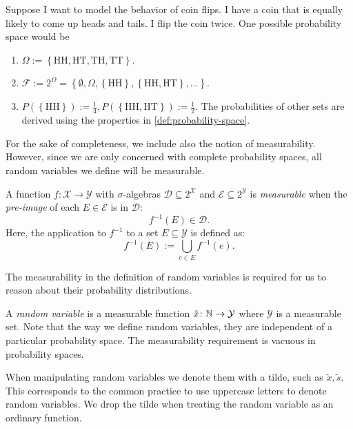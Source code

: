 \begin{example} \label{exm:probability-space}
 Suppose I want to model the behavior of coin flips. I have a coin that is equally likely to come up heads and tails. I flip the coin twice. One possible probability space would be
  \begin{enumerate}
  \item $\Omega := \left\{ \mathrm{HH}, \mathrm{HT}, \mathrm{TH}, \mathrm{TT} \right\}$.
  \item $\mathcal{F} := 2^{\Omega } = \left\{ \emptyset, \Omega, \left\{ \mathrm{HH} \right\}, \left\{ \mathrm{HH}, \mathrm{HT} \right\}, \dots  \right\}$.
  \item $P(\left\{ \mathrm{HH} \right\}) := \frac{1}{4},  P(\left\{ \mathrm{HH}, \mathrm{HT} \right\}) := \frac{1}{2}$. The probabilities of other sets are derived using the properties in \cref{def:probability-space}.
  \end{enumerate}
\end{example}


For the sake of completeness, we include also the notion of measurability. However, since we are only concerned with complete probability spaces, all random variables we define will be measurable. 
\begin{definition} \label{def:preimage-measurable}
A function $f\colon \mathcal{X} \to \mathcal{Y}$ with $\sigma$-algebras $\mathcal{D} \subseteq 2^{\mathcal{X}}$ and $\mathcal{E} \subseteq 2^{\mathcal{Y}}$ is \emph{measurable} when the \emph{pre-image} of each $E\in \mathcal{E}$ is in $\mathcal{D}$:
  \[
    f^{-1}(E) \in \mathcal{D}.
  \]
Here, the application to $f^{-1}$ to a set $E \subseteq \mathcal{Y}$ is defined as:
\begin{equation} 
f^{-1}(E) := \bigcup_{e \in E} f^{-1}(e) .
\end{equation}
\end{definition}
The measurability in the definition of random variables is required for us to reason about their probability distributions.

\begin{definition}
  A \emph{random variable} is a measurable function $\tilde{x}\colon \mathbb{N} \to \mathcal{Y}$ where $\mathcal{Y}$ is a measurable set. Note that the way we define random variables, they are independent of a particular probability space. The measurability requirement is vacuous in probability spaces.
\end{definition}
When manipulating random variables we denote them with a tilde, such as $\tilde{x}, \tilde{s}$. This corresponds to the common practice to use uppercase letters to denote random variables. We drop the tilde when treating the random variable as an ordinary function. 

